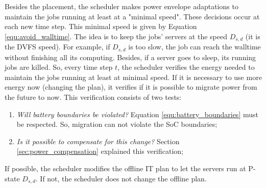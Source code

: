 Besides the placement, the scheduler makes power envelope adaptations to maintain the jobs running at least at a "minimal speed". These decisions occur at each new time step. This minimal speed is given by Equation \ref{equ:avoid_walltime}. The idea is to keep the jobs' servers at the speed $D_{s,d}$ (it is the DVFS speed). For example, if $D_{s,d}$ is too slow, the job can reach the walltime without finishing all its computing. Besides, if a server goes to sleep, its running jobs are killed. So, every time step $t$, the scheduler verifies the energy needed to maintain the jobs running at least at minimal speed. If it is necessary to use more energy now (changing the plan), it verifies if it is possible to migrate power from the future to now. This verification consists of two tests:
\begin{enumerate}
    \item \textit{Will battery boundaries be violated?} Equation \ref{equ:battery_boundaries} must be respected. So, migration can not violate the SoC boundaries;
    \item \textit{Is it possible to compensate for this change?} Section \ref{sec:power_compensation} explained this verification;
\end{enumerate}

If possible, the scheduler modifies the offline IT plan to let the servers run at P-state $D_{s,d}$. If not, the scheduler does not change the offline plan.

